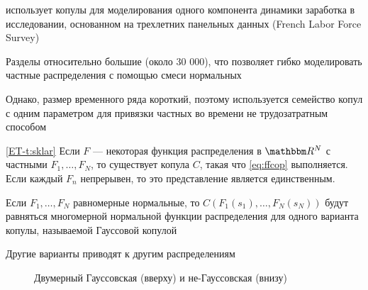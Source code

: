 \begin{frame}

    \vspace{2em}
    \Eg
    \cite{bonhomme2009assessing} использует копулы для моделирования одного компонента динамики заработка в исследовании, основанном на трехлетних панельных данных (French Labor Force Survey)
    
    Разделы относительно большие (около 30 000), что позволяет гибко моделировать частные распределения с помощью смеси нормальных
    
    Однако, размер временного ряда короткий, поэтому используется семейство копул с одним параметром для привязки частных во времени не трудозатратным способом

\end{frame}

\begin{frame}

    \vspace{2em}
    \Thm\eqref{ET-t:sklar}
        Если $F$ --- некоторая функция распределения в $\RR^N$ с частными $F_1, \ldots, F_N$,
        то существует копула $C$, такая что \eqref{eq:ffcop} выполняется. Если каждый
        $F_n$ непрерывен, то это представление является единственным.
        
\end{frame}

\begin{frame}

    \vspace{2em}
    Если $F_1, \ldots, F_N$ равномерные нормальные, то $C(F_1(s_1), \ldots, F_N(s_N))$
    будут равняться многомерной нормальной функции распределения для одного варианта копулы,
    называемой Гауссовой копулой
    
    \vspace{2em}
    Другие варианты приводят к другим распределениям
    
\end{frame}

\begin{frame}
    
    \vspace{2em}
    \begin{figure}
       \centering
       \caption{\label{f:copula} Двумерный Гауссовская (вверху) и не-Гауссовская (внизу)}
    \end{figure}
    
\end{frame}

